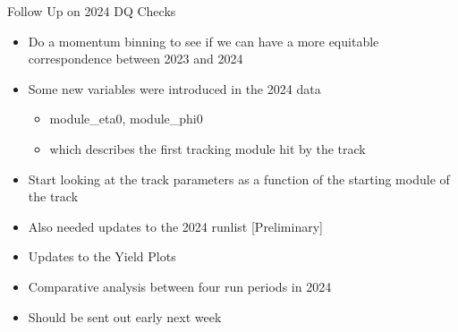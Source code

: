 \begin{frame}{Follow Up on 2024 DQ Checks}
    \begin{itemize}
        \item Do a momentum binning to see if we can have a more equitable correspondence between 2023 and 2024
        \item Some new variables were introduced in the 2024 data
        \begin{itemize}
            \item module\_eta0, module\_phi0 
            \item which describes the first tracking module hit by the track
        \end{itemize}
    \item Start looking at the track parameters as a function of the starting module of the track
    \item Also needed updates to the 2024 runlist [Preliminary]
    \item Updates to the Yield Plots 
    \item Comparative analysis between four run periods in 2024
    \item Should be sent out early next week
    \end{itemize}
\end{frame}


